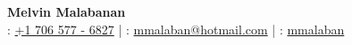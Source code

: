 \documentclass[11pt, letterpaper]{article}
\begin{document}
\begin{center}
    {\Large \textbf{Melvin Malabanan}} \\ [0.5em]
    \faPhone: \href{tel:+17065776827}{+1 706 577 - 6827} \quad | \quad
    \faEnvelope: \href{mailto:mmalaban@hotmailcom}{mmalaban@hotmail.com} \quad | \quad
    \faGithub: \href{https://github.com/mmalaban}{mmalaban}
\end{center}

\vspace{0.5em}




\end{document}
